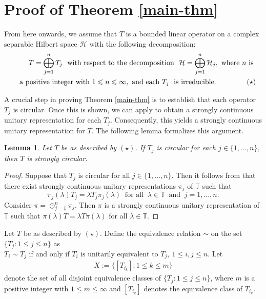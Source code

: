 \documentclass[a4paper,oneside,10pt, reqno]{amsproc}
\newtheorem{lemma}[theorem]{Lemma}%
\theoremstyle{remark}
\theoremstyle{definition}
\newcommand{\beq}{\begin{eqnarray}}
\newcommand{\eeq}{\end{eqnarray}}
\begin{document}
\section{Proof of Theorem \ref{main-thm}}

From here onwards, we assume that $T$ is a bounded linear operator on a complex separable Hilbert space $\mathcal H$ with the following decomposition:
\begin{eqnarray*}\label{T-decom}
&& T = \bigoplus_{j=1}^n T_j\ \text{ with respect to the decomposition }\ \mathcal H = \bigoplus_{j=1}^n \mathcal H_j, 
 \text{ where $n$ is }\\ 
 && \text{ a positive integer with } 1 \leqslant n \leqslant \infty, \text{ and each } T_j\  \text{ is irreducible}. \hspace{1.5cm} (\star)
\end{eqnarray*}

A crucial step in proving Theorem \ref{main-thm} is to establish that each operator $T_j$ is circular. Once this is shown, we can apply \cite[Proposition 1.3]{AHHK} to obtain a strongly continuous unitary representation for each $T_j$. Consequently, this yields a strongly continuous unitary representation for $T$. The following lemma formalizes this argument.  

\begin{lemma}\label{first-lemma}
Let $T$ be as described by $(\star)$. If $T_j$ is circular for each $j \in \{1, \ldots, n\}$, then $T$ is strongly circular.
\end{lemma}

\begin{proof}
Suppose that $T_j$ is circular for all $j \in \{1, \ldots, n\}$. Then it follows from \cite[Proposition 1.3]{AHHK} that there exist strongly continuous unitary representations $\pi_j$ of $\mathbb{T}$ such that
\[
\pi_j(\lambda) T_j = \lambda T_j \pi_j(\lambda)\ \text{ for all }\ \lambda \in \mathbb{T}\ \text{ and }\ j = 1, \ldots, n.
\]
Consider $\pi = \oplus_{j=1}^n \pi_j$. Then $\pi$ is a strongly continuous
unitary representation of $\mathbb{T}$ such that $\pi(\lambda) T = \lambda T \pi(\lambda)$ for all $\lambda \in \mathbb{T}$. 
\end{proof}

Let $T$ be as described by $(\star)$. Define the equivalence relation $\sim$ on the set $\{T_j : 1 \leqslant j \leqslant n\}$ as
$T_i \sim T_j \text{ if and only if } T_i \text{ is unitarily equivalent to } T_j,\ 1 \leqslant i,j \leqslant n$.
Let 
\beq\label{eq-relation-1}
X := \big\{[T_{i_k}] : 1 \leqslant k \leqslant m\big\} 
\eeq
denote the set of all disjoint equivalence classes of $\{T_j : 1 \leqslant j \leqslant n\}$, where $m$ is a positive integer with $1 \leqslant m \leqslant \infty$ and $[T_{i_k}]$ denotes the equivalence class of $T_{i_k}$.
\end{document}
